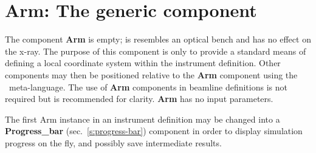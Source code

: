 \section{Arm: The generic component}
\label{s:arm}

The component \textbf{Arm} is empty; is resembles an optical bench
and has no effect on the x-ray.
The purpose of this component is only to provide a standard
means of defining a local coordinate system within the instrument definition.
Other components may then be
positioned relative to the \textbf{Arm} component
using the \MCX\ meta-language.
The use of \textbf{Arm} components in beamline definitions
is not required but is recommended for clarity.
\textbf{Arm} has no input parameters.

The first Arm instance in an instrument definition may be changed into a
\textbf{Progress\_bar} (sec.~\ref{s:progress-bar}) component in order to display
simulation progress on the fly, and possibly save intermediate results.
